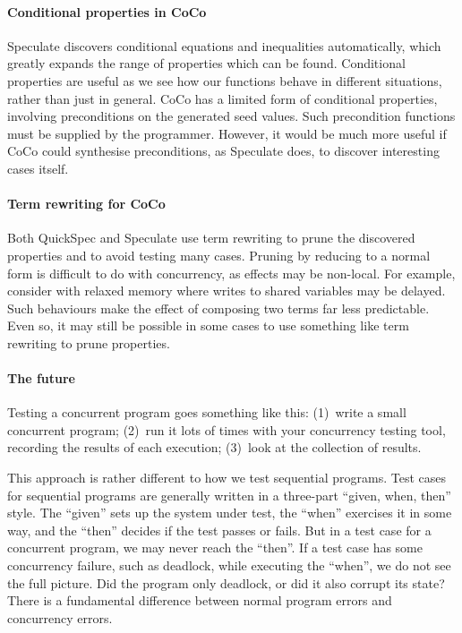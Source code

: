 \paragraph{Conditional properties in CoCo}
Speculate\cite{braquehais2017} discovers conditional equations and
inequalities automatically, which greatly expands the range of
properties which can be found.  Conditional properties are useful as
we see how our functions behave in different situations, rather than
just in general.  CoCo has a limited form of conditional properties,
involving preconditions on the generated seed values.  Such
precondition functions must be supplied by the programmer.  However,
it would be much more useful if CoCo could synthesise preconditions,
as Speculate does, to discover interesting cases itself.

\paragraph{Term rewriting for CoCo}
Both QuickSpec\cite{smallbone2017} and Speculate\cite{braquehais2017}
use term rewriting to prune the discovered properties and to avoid
testing many cases.  Pruning by reducing to a normal form is difficult
to do with concurrency, as effects may be non-local.  For example,
consider with relaxed memory where writes to shared variables may be
delayed\cite{zhang2015}.  Such behaviours make the effect of composing
two terms far less predictable.  Even so, it may still be possible in
some cases to use something like term rewriting to prune properties.

\paragraph{The future}
Testing a concurrent program goes something like this: (1)~write a
small concurrent program; (2)~run it lots of times with your
concurrency testing tool, recording the results of each execution;
(3)~look at the collection of results.

This approach is rather different to how we test sequential programs.
Test cases for sequential programs are generally written in a
three-part ``given, when, then'' style\cite{fowler2013}.  The
``given'' sets up the system under test, the ``when'' exercises it in
some way, and the ``then'' decides if the test passes or fails.  But
in a test case for a concurrent program, we may never reach the
``then''.  If a test case has some concurrency failure, such as
deadlock, while executing the ``when'', we do not see the full
picture.  Did the program only deadlock, or did it also corrupt its
state?  There is a fundamental difference between normal program
errors and concurrency errors.

